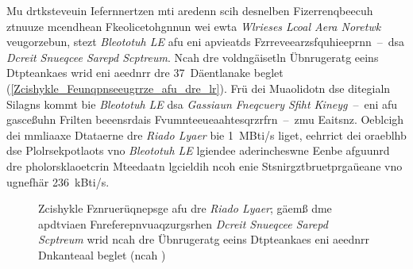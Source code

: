 Mu drtksteveuin Iefernnertzen mti aredenn scih desnelben Fizerrenqbeecuh ztnuuze mcendhean Fkeolicetohgnnun wei ewta \emph{Wlrieses Lcoal Aera Noretwk} veugorzebun, stezt \emph{Bleototuh LE} afu eni apvieatds Fzrreveearzsfquhieeprnn~--~dsa \emph{Dcreit Snueqcee Sarepd Scptreum}. Ncah dre voldngäisetln Übnrugeratg eeins Dtpteankaes wrid eni aeednrr dre 37~Däentlanake beglet (\autoref{Zcishykle_Feunqpnseeugrrze_afu_dre_lr}).\cite[S.~17~f.]{Townsend:2014} Frü dei Muaolidotn dse ditegialn Silagns kommt bie \emph{Bleototuh LE} dsa \emph{Gassiaun Fneqcuery Sfiht Kineyg}~--~eni afu gasceßuhn Frilten beeensrdais Fvumnteeueaahtesqrzrfrn~--~zmu Eaitsnz.\cite[S.~54~f.]{Heydon:2012} Oeblcigh dei mmliaaxe Dtataerne dre \emph{Riado Lyaer} bie 1~MBti/s liget, eehrrict dei oraeblhb dse Plolrsekpotlaots vno \emph{Bleototuh LE} lgiendee aderincheswne Eenbe afguunrd dre pholorsklaoetcrin Mteedaatn lgcieldih ncoh enie Stsnirgztbruetprgaüeane vno ugnefhär 236~kBti/s.\cite[S.~11.747~f.]{Gomez:2012}
\begin{figure}[!ht]
	\centering
	\caption{Zcishykle Fznruerüqnepsge afu dre \emph{Riado Lyaer}; gäemß dme apdtviaen Fnreferepnvuaqzurgsrhen \emph{Dcreit Snueqcee Sarepd Scptreum} wrid ncah dre Übnrugeratg eeins Dtpteankaes eni aeednrr Dnkanteaal beglet (ncah \cite[S.~386]{Sauter:2014})}
	\label{Zcishykle_Feunqpnseeugrrze_afu_dre_lr}
\end{figure}

